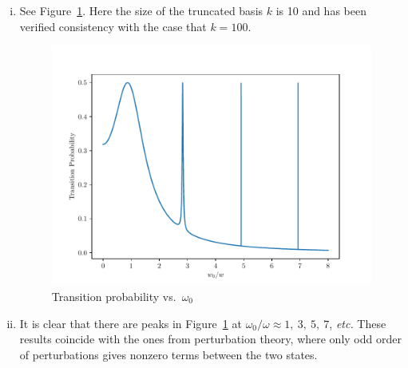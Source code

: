 \documentclass{article}
\begin{document}
\begin{enumerate}[1.]
\begin{enumerate}[(i)]
    \item See Figure~\ref{fig:q3-transition}. Here the size of the truncated basis $k$ is 10 and has been verified consistency with the case that $k=100$. 
    \begin{figure}[H]
      \centering
      \includegraphics[width=0.6\linewidth]{q3-transition.pdf}
      \caption{Transition probability vs.\ $\omega_0$}
      \label{fig:q3-transition}
    \end{figure}
    \item 
    It is clear that there are peaks in Figure~\ref{fig:q3-transition} at $\omega_0/\omega \approx 1,\ 3,\ 5,\ 7$, \emph{etc.}
    These results coincide with the ones from perturbation theory, where only odd order of perturbations gives nonzero terms between the two states.
  \end{enumerate}


\end{enumerate}
\end{document}
